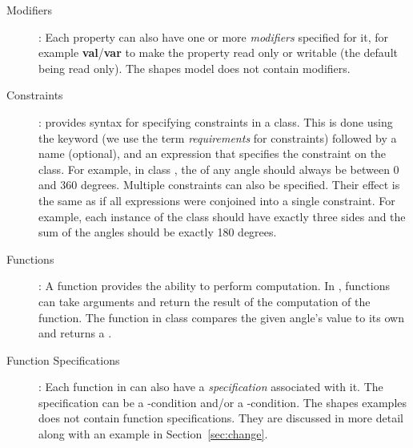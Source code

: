 \begin{description}
\item [Modifiers]: Each property can also have one or more
  \emph{modifiers} specified for it, for example
  {\bf val}/{\bf var} to make the property read only or writable (the default being
    read only). The shapes model does not contain modifiers.
  
\item [Constraints]: \Klang{} provides syntax for specifying
  constraints in a class. This is done using the  keyword
  (we use the term {\em requirements} for constraints)
  followed by a name (optional), and an expression that specifies the
  constraint on the class. 
  For example, in class , the
   of any angle should always be between 0 and 360
  degrees. Multiple constraints can also be specified. Their effect is
  the same as if all expressions were conjoined into a single
  constraint. For example, each instance of the  class
  should have exactly three sides and the sum of the angles should be
  exactly 180 degrees.
  
\item [Functions]: A function provides the ability to perform
  computation. In \Klang{}, functions can take arguments and return
  the result of the computation of the function. The 
  function in class  compares the given angle's value to
  its own and returns a .

\item [Function Specifications]: Each function in \Klang{} can also
  have a \emph{specification} associated with it. The specification
  can be a -condition and/or a
  -condition. The shapes examples does not contain function
  specifications. They are discussed in more detail along with
  an example in Section~\ref{sec:change}.
  

\end{description}
